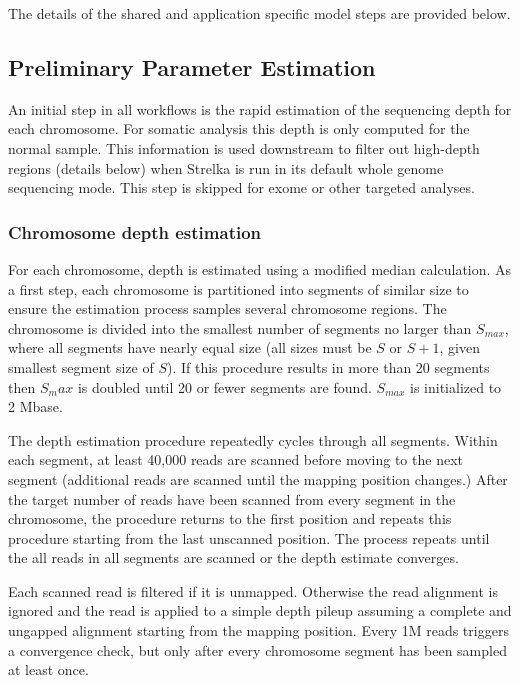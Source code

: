 \documentclass{article}
\begin{document}
The details of the shared and application specific model steps are provided below.


\subsection{Preliminary Parameter Estimation}

An initial step in all workflows is the rapid estimation of the sequencing depth for each chromosome. For somatic analysis this depth is only computed for the normal sample. This information is used downstream to filter out high-depth regions (details below) when Strelka is run in its default whole genome sequencing mode. This step is skipped for exome or other targeted analyses.

\subsubsection{Chromosome depth estimation}

For each chromosome, depth is estimated using a modified median calculation. As a first step, each chromosome is partitioned into segments of similar size to ensure the estimation process samples several chromosome regions. The chromosome is divided into the smallest number of segments no larger than $S_{max}$, where all segments have nearly equal size (all sizes must be $S$ or $S+1$, given smallest segment size of $S$). If this procedure results in more than 20 segments then $S_max$ is doubled until 20 or fewer segments are found. $S_{max}$ is initialized to 2 Mbase.

The depth estimation procedure repeatedly cycles through all segments. Within each segment, at least 40,000 reads are scanned before moving to the next segment (additional reads are scanned until the mapping position changes.) After the target number of reads have been scanned from every segment in the chromosome, the procedure returns to the first position and repeats this procedure starting from the last unscanned position. The process repeats until the all reads in all segments are scanned or the depth estimate converges.

Each scanned read is filtered if it is unmapped. Otherwise the read alignment is ignored and the read is applied to a simple depth pileup assuming a complete and ungapped alignment starting from the mapping position. Every 1M reads triggers a convergence check, but only after every chromosome segment has been sampled at least once.
\end{document}
